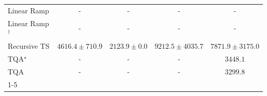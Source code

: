 \begin{tabular}{l|cccc|}
Linear Ramp & {\cellcolor[HTML]{000000}} \color[HTML]{F1F1F1} {\cellcolor{white}} \color{black} - & {\cellcolor[HTML]{000000}} \color[HTML]{F1F1F1} {\cellcolor{white}} \color{black} - & {\cellcolor[HTML]{000000}} \color[HTML]{F1F1F1} {\cellcolor{white}} \color{black} - & {\cellcolor[HTML]{000000}} \color[HTML]{F1F1F1} {\cellcolor{white}} \color{black} - \\
Linear Ramp$^\dagger$ & {\cellcolor[HTML]{000000}} \color[HTML]{F1F1F1} {\cellcolor{white}} \color{black} - & {\cellcolor[HTML]{000000}} \color[HTML]{F1F1F1} {\cellcolor{white}} \color{black} - & {\cellcolor[HTML]{000000}} \color[HTML]{F1F1F1} {\cellcolor{white}} \color{black} - & {\cellcolor[HTML]{000000}} \color[HTML]{F1F1F1} {\cellcolor{white}} \color{black} - \\
Recursive TS & {\cellcolor[HTML]{9CB9D9}} \color[HTML]{000000} $4616.4\pm 710.9$ & {\cellcolor[HTML]{F4EDF6}} \color[HTML]{000000} $2123.9\pm 0.0$ & {\cellcolor[HTML]{023858}} \color[HTML]{F1F1F1} $9212.5\pm 4035.7$ & {\cellcolor[HTML]{04629A}} \color[HTML]{F1F1F1} $7871.9\pm 3175.0$ \\
TQA$^\star$ & {\cellcolor[HTML]{000000}} \color[HTML]{F1F1F1} {\cellcolor{white}} \color{black} - & {\cellcolor[HTML]{000000}} \color[HTML]{F1F1F1} {\cellcolor{white}} \color{black} - & {\cellcolor[HTML]{000000}} \color[HTML]{F1F1F1} {\cellcolor{white}} \color{black} - & {\cellcolor[HTML]{D1D2E6}} \color[HTML]{000000} $3448.1$ \\
TQA & {\cellcolor[HTML]{000000}} \color[HTML]{F1F1F1} {\cellcolor{white}} \color{black} - & {\cellcolor[HTML]{000000}} \color[HTML]{F1F1F1} {\cellcolor{white}} \color{black} - & {\cellcolor[HTML]{000000}} \color[HTML]{F1F1F1} {\cellcolor{white}} \color{black} - & {\cellcolor[HTML]{D5D5E8}} \color[HTML]{000000} $3299.8$ \\
\cline{1-5}
\bottomrule
\end{tabular}
